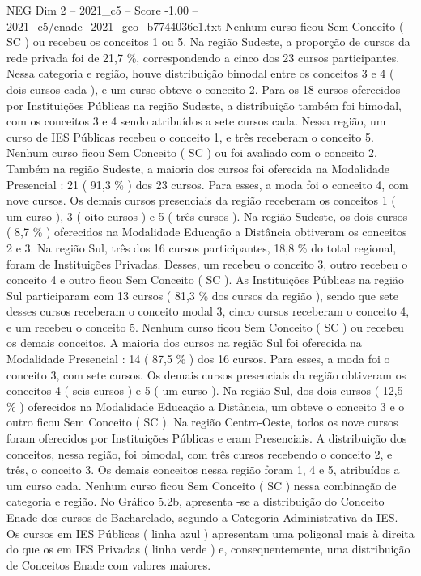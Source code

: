 \begin{textsample}{NEG Dim 2 – 2021\_c5 – Score -1.00 – 2021\_c5/enade\_2021\_geo\_b7744036e1.txt}
Nenhum curso ficou Sem Conceito ( SC ) ou recebeu os conceitos 1 ou 5.
Na região Sudeste, a proporção de cursos da rede privada foi de 21,7 \%, correspondendo a cinco dos 23 cursos participantes.
Nessa categoria e região, houve distribuição bimodal entre os conceitos 3 e 4 ( dois cursos cada ), e um curso obteve o conceito 2.
Para os 18 cursos oferecidos por Instituições Públicas na região Sudeste, a distribuição também foi bimodal, com os conceitos 3 e 4 sendo atribuídos a sete cursos cada.
Nessa região, um curso de IES Públicas recebeu o conceito 1, e três receberam o conceito 5.
Nenhum curso ficou Sem Conceito ( SC ) ou foi avaliado com o conceito 2.
Também na região Sudeste, a maioria dos cursos foi oferecida na Modalidade Presencial : 21 ( 91,3 \% ) dos 23 cursos.
Para esses, a moda foi o conceito 4, com nove cursos.
Os demais cursos presenciais da região receberam os conceitos 1 ( um curso ), 3 ( oito cursos ) e 5 ( três cursos ).
Na região Sudeste, os dois cursos ( 8,7 \% ) oferecidos na Modalidade Educação a Distância obtiveram os conceitos 2 e 3.
Na região Sul, três dos 16 cursos participantes, 18,8 \% do total regional, foram de Instituições Privadas.
Desses, um recebeu o conceito 3, outro recebeu o conceito 4 e outro ficou Sem Conceito ( SC ).
As Instituições Públicas na região Sul participaram com 13 cursos ( 81,3 \% dos cursos da região ), sendo que sete desses cursos receberam o conceito modal 3, cinco cursos receberam o conceito 4, e um recebeu o conceito 5.
Nenhum curso ficou Sem Conceito ( SC ) ou recebeu os demais conceitos.
A maioria dos cursos na região Sul foi oferecida na Modalidade Presencial : 14 ( 87,5 \% ) dos 16 cursos.
Para esses, a moda foi o conceito 3, com sete cursos.
Os demais cursos presenciais da região obtiveram os conceitos 4 ( seis cursos ) e 5 ( um curso ).
Na região Sul, dos dois cursos ( 12,5 \% ) oferecidos na Modalidade Educação a Distância, um obteve o conceito 3 e o outro ficou Sem Conceito ( SC ).
Na região Centro-Oeste, todos os nove cursos foram oferecidos por Instituições Públicas e eram Presenciais.
A distribuição dos conceitos, nessa região, foi bimodal, com três cursos recebendo o conceito 2, e três, o conceito 3.
Os demais conceitos nessa região foram 1, 4 e 5, atribuídos a um curso cada.
Nenhum curso ficou Sem Conceito ( SC ) nessa combinação de categoria e região.
No Gráfico 5.2b, apresenta -se a distribuição do Conceito Enade dos cursos de Bacharelado, segundo a Categoria Administrativa da IES.
Os cursos em IES Públicas ( linha azul ) apresentam uma poligonal mais à direita do que os em IES Privadas ( linha verde ) e, consequentemente, uma distribuição de Conceitos Enade com valores maiores.

\end{textsample}
